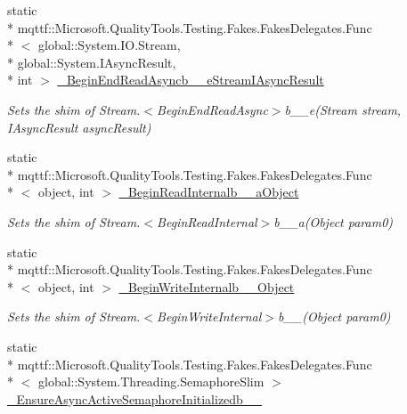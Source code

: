 \begin{DoxyCompactItemize}
static \\*
mqttf\-::\-Microsoft.\-Quality\-Tools.\-Testing.\-Fakes.\-Fakes\-Delegates.\-Func\\*
$<$ global\-::\-System.\-I\-O.\-Stream, \\*
global\-::\-System.\-I\-Async\-Result, \\*
int $>$ \hyperlink{class_system_1_1_i_o_1_1_fakes_1_1_shim_stream_ad65a7a7a8e568e732e497b6447c33548}{\-\_\-\-Begin\-End\-Read\-Asyncb\-\_\-\-\_\-e\-Stream\-I\-Async\-Result}
\begin{DoxyCompactList}\small\item\em Sets the shim of Stream.$<$Begin\-End\-Read\-Async$>$b\-\_\-\-\_\-e(\-Stream stream, I\-Async\-Result async\-Result)\end{DoxyCompactList}\item 
static \\*
mqttf\-::\-Microsoft.\-Quality\-Tools.\-Testing.\-Fakes.\-Fakes\-Delegates.\-Func\\*
$<$ object, int $>$ \hyperlink{class_system_1_1_i_o_1_1_fakes_1_1_shim_stream_a4ceb078f96effec4fbbf897717deaf81}{\-\_\-\-Begin\-Read\-Internalb\-\_\-\-\_\-a\-Object}
\begin{DoxyCompactList}\small\item\em Sets the shim of Stream.$<$Begin\-Read\-Internal$>$b\-\_\-\-\_\-a(\-Object param0)\end{DoxyCompactList}\item 
static \\*
mqttf\-::\-Microsoft.\-Quality\-Tools.\-Testing.\-Fakes.\-Fakes\-Delegates.\-Func\\*
$<$ object, int $>$ \hyperlink{class_system_1_1_i_o_1_1_fakes_1_1_shim_stream_aa4c7c89f40b61fbade1e368cf7fe4d5a}{\-\_\-\-Begin\-Write\-Internalb\-\_\-\-\_\-Object}
\begin{DoxyCompactList}\small\item\em Sets the shim of Stream.$<$Begin\-Write\-Internal$>$b\-\_\-\-\_(\-Object param0)\end{DoxyCompactList}\item 
static \\*
mqttf\-::\-Microsoft.\-Quality\-Tools.\-Testing.\-Fakes.\-Fakes\-Delegates.\-Func\\*
$<$ global\-::\-System.\-Threading.\-Semaphore\-Slim $>$ \hyperlink{class_system_1_1_i_o_1_1_fakes_1_1_shim_stream_aae69bbadba2395d8417ef2f47211a102}{\-\_\-\-Ensure\-Async\-Active\-Semaphore\-Initializedb\-\_\-\-\_}

\end{DoxyCompactItemize}
